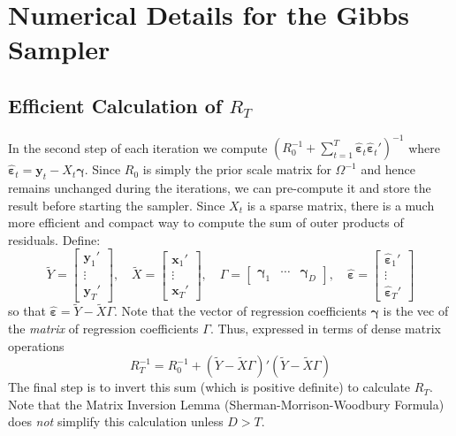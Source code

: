 \documentclass[12pt]{article}
\begin{document}
\section{Numerical Details for the Gibbs Sampler}


\subsection{Efficient Calculation of $R_T$}
In the second step of each iteration we compute 
$\left( R_0^{-1} + \sum_{t=1}^{T} \hat{\boldsymbol{\varepsilon}}_t\hat{\boldsymbol{\varepsilon}}_t'\right)^{-1}$ 
where 
$\hat{\boldsymbol{\varepsilon}}_t=\mathbf{y}_t - X_t \boldsymbol{\gamma}$.
Since $R_0$ is simply the prior scale matrix for $\Omega^{-1}$ and hence remains unchanged during the iterations, we can pre-compute it and store the result before starting the sampler.
Since $X_t$ is a sparse matrix, there is a much more efficient and compact way to compute the sum of outer products of residuals.
Define:
\begin{equation*}
  \widetilde{Y} = \left[
  \begin{array}{c}
    \mathbf{y}_1'\\
    \vdots \\
    \mathbf{y}_T'
  \end{array}
\right], \quad \widetilde{X} = \left[
\begin{array}{c}
  \mathbf{x}_{1}' \\
  \vdots \\
  \mathbf{x}_{T}' 
\end{array}
\right], \quad \Gamma = \left[
\begin{array}{ccc}
  \boldsymbol{\gamma}_1 & \cdots & \boldsymbol{\gamma}_D
\end{array}
\right], \quad \hat{\boldsymbol{\varepsilon}} = \left[
\begin{array}{c}
  \hat{\boldsymbol{\varepsilon}}_1' \\
  \vdots \\
  \hat{\boldsymbol{\varepsilon}}_T'
\end{array}
\right]
\end{equation*}
so that $\hat{\boldsymbol{\varepsilon}} = \widetilde{Y} - \widetilde{X} \Gamma$.
Note that the vector of regression coefficients $\boldsymbol{\gamma}$ is the vec of the \emph{matrix} of regression coefficients $\Gamma$. 
Thus, expressed in terms of dense matrix operations
\begin{equation*}
  R_T^{-1} =  R_0^{-1} + \left( \widetilde{Y} - \widetilde{X} \Gamma \right)'\left( \widetilde{Y} - \widetilde{X} \Gamma \right)
\end{equation*}
The final step is to invert this sum (which is positive definite) to calculate $R_T$.
Note that the Matrix Inversion Lemma (Sherman-Morrison-Woodbury Formula) does \emph{not} simplify this calculation unless $D > T$.
\end{document}
